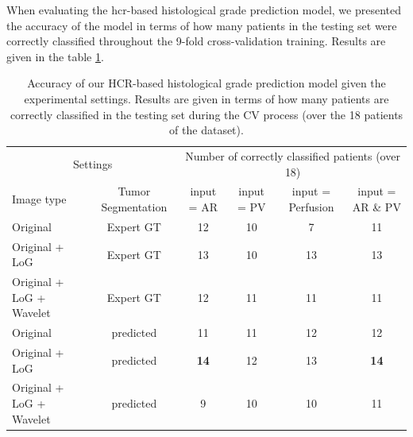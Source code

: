 When evaluating the \ac{hcr}-based histological grade prediction model, we presented the accuracy of the model in terms of how many patients in the testing set were correctly classified throughout the 9-fold cross-validation training. Results are given in the table \ref{tab:hcrGrade}.
\renewcommand{\arraystretch}{2}
\begin{table}[!htp]
	\centering
	\caption{Accuracy of our HCR-based histological grade prediction model given the experimental settings. Results are given in terms of how many patients are correctly classified in the testing set during the CV process (over the 18 patients of the dataset).}\label{tab:hcrGrade}
	\scriptsize
	\begin{tabular}{lccccc}\toprule
		\multicolumn{2}{c}{Settings} &\multicolumn{4}{c}{Number of correctly classified patients (over 18)} \\\cmidrule{1-6}
		Image type &Tumor Segmentation & input = AR &input = PV &input = Perfusion & input = AR \& PV \\\midrule
		Original & Expert GT & 12  & 10  & 7 & 11 \\
		Original + LoG & Expert GT & 13  & 10  & 13 & 13 \\
		Original + LoG + Wavelet & Expert GT & 12  & 11  & 11 & 11 \\
		Original & predicted & 11  & 11  & 12 & 12 \\
		Original + LoG & predicted & \textbf{14}  & 12  & 13 & \textbf{14} \\
		Original + LoG + Wavelet & predicted & 9  & 10  & 10 & 11 \\
		\bottomrule
	\end{tabular}
\end{table}
\renewcommand{\arraystretch}{5}


